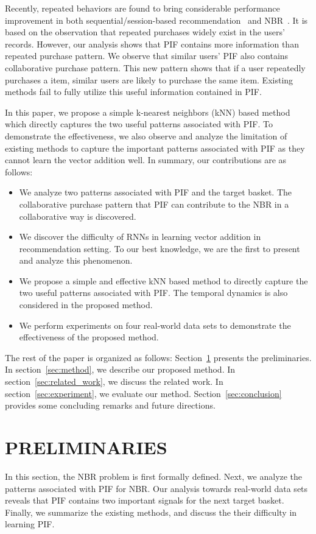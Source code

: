 \documentclass[sigconf]{acmart}
\begin{document}
Recently, repeated behaviors are found to bring  considerable  performance  improvement in both sequential/session-based recommendation~\cite{wang2019modeling}\cite{ren2019repeatnet} and NBR~\cite{hu2019sets2sets}. It is based on the observation that repeated purchases widely exist in the users' records. However, our analysis shows  that PIF contains more information than repeated  purchase pattern. We  observe that similar users' PIF also contains  collaborative purchase pattern. This new pattern shows that if a user repeatedly purchases a  item, similar users are likely to purchase the same  item. Existing methods fail to fully utilize this  useful information  contained in PIF. 

In this paper, 
we propose a  simple k-nearest  neighbors (kNN)  based method which directly captures the two useful patterns associated with PIF. To demonstrate the  effectiveness, we  also observe and  analyze the  limitation of  existing  methods to capture the  important patterns associated with PIF as they cannot learn the vector  addition well. In  summary,  our  contributions are as follows:
\begin{itemize}
    \item We analyze two  patterns associated with PIF and the target basket. The collaborative purchase pattern that PIF can contribute to the NBR  in a  collaborative way is discovered. 
    \item We discover the  difficulty of RNNs in learning  vector addition in  recommendation setting.  To our best  knowledge, we  are the first to present and  analyze this  phenomenon. 
    \item We propose a  simple and effective kNN based method to directly capture the two useful patterns  associated with PIF.  The  temporal  dynamics is also considered in the proposed method.  
    \item We  perform  experiments on four real-world data sets to  demonstrate the  effectiveness  of the proposed method.    
\end{itemize}

The rest of the paper is organized as follows: 
Section~\ref{sec:preliminaries} presents the preliminaries.  In section~\ref{sec:method}, we describe our proposed method.
In section~\ref{sec:related_work}, we discuss the related work. In section~\ref{sec:experiment}, we evaluate our method. Section~\ref{sec:conclusion} provides some concluding remarks and future directions.

\section{PRELIMINARIES}
\label{sec:preliminaries}
In this section, the NBR  problem is first formally defined. Next, we analyze the  patterns associated with PIF for NBR. Our analysis towards  real-world data sets  reveals that PIF contains  two important signals for  the next target basket.  Finally, we summarize the  existing methods, and  discuss the their difficulty in learning PIF.   
\end{document}
